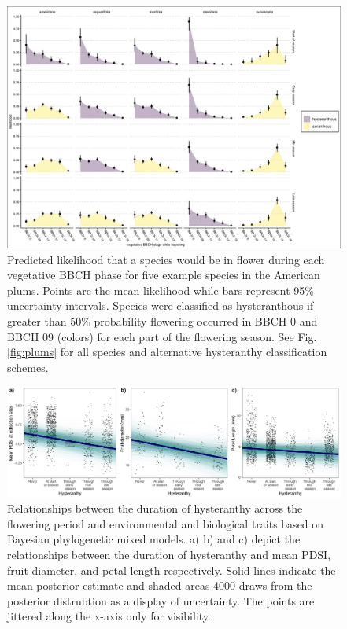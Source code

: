 \documentclass{article}[12pt]
\begin{document}
{\begin{figure}[h!]
    \centering
 \includegraphics[width=\textwidth]{..//..//Plots/ord_quants_exmpsps.jpeg}
    \caption{Predicted likelihood that a species would be in flower during each vegetative BBCH phase for five example species in the American plums. Points are the mean likelihood while bars represent 95\% uncertainty intervals. Species were classified as hysteranthous if greater than 50\% probability flowering occurred in BBCH 0 and BBCH 09 (colors) for each part of the flowering season.
  See Fig. \ref{fig:plums} for all species and alternative hysteranthy classification schemes. }
    \label{fig:ordinals}
\end{figure}




\begin{figure}[h!]
    \centering
 \includegraphics[width=\textwidth]{..//..//Plots/dataplots.jpeg}
    \caption{Relationships between the duration of hysteranthy across the flowering period and environmental and biological traits based on Bayesian phylogenetic mixed models. a) b) and c) depict the relationships between the duration of hysteranthy and mean PDSI, fruit diameter, and petal length respectively. Solid lines indicate the mean posterior estimate and shaded areas 4000 draws from the posterior distrubtion as a display of uncertainty. The points are jittered along the x-axis only for visibility.}
    \label{fig:prunes}
\end{figure}


}
\end{document}
